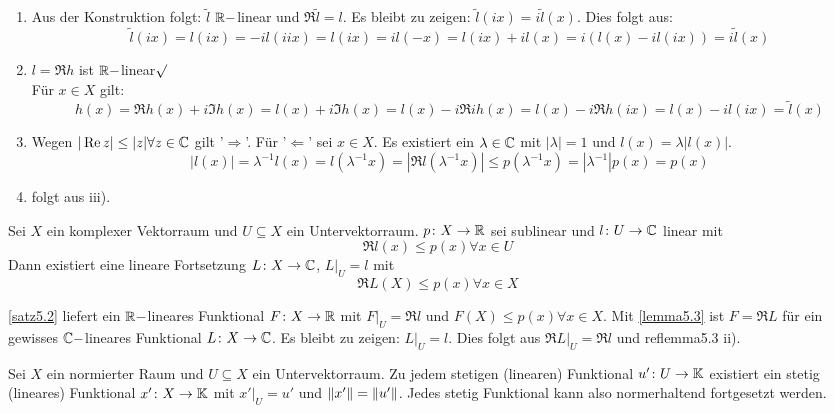 \begin{beweis}
	\begin{enumerate}
		\item Aus der Konstruktion folgt: $ \tilde l $ $ \mathbb{R}- $linear und $ \Re\tilde l=l $. Es bleibt zu zeigen: $ \tilde l(ix)=i\tilde l(x) $. Dies folgt aus:
		\[ \tilde l(ix)=l(ix)=-il(iix)=l(ix)=il(-x)=l(ix)+il(x)=i(l(x)-il(ix))=i\tilde l(x) \]
		\item $ l=\Re h $ ist $ \mathbb{R}- $linear$ \surd $\\
		F\"ur $ x\in X $ gilt:
		\[ h(x)=\Re h(x)+i\Im h(x)=l(x)+i\Im h(x)=l(x)-i\Re ih(x)=l(x)-i\Re h(ix)=l(x)-il(ix)=\tilde l(x) \] 
		\item Wegen $ |\operatorname{Re} z|\leq |z|\forall z\in\mathbb{C} $ gilt '$ \Rightarrow $'. F\"ur '$ \Leftarrow $' sei $ x\in X $. Es existiert ein $ \lambda\in\mathbb{C} $ mit $ |\lambda|=1 $ und $ l(x)=\lambda|l(x)| $.
		\[ |l(x)|=\lambda^{-1}l(x)=l(\lambda^{-1}x)=|\Re l(\lambda^{-1}x)|\leq p(\lambda^{-1}x)=|\lambda^{-1}|p(x)=p(x) \]
		\item folgt aus iii).
	\end{enumerate}
\end{beweis}
\begin{satz}
	Sei $ X $ ein komplexer Vektorraum und $ U\subseteq X $ ein Untervektorraum. $ p\colon X\rightarrow\mathbb{R} $ sei sublinear und $ l\colon U\rightarrow\mathbb{C} $ linear mit \[ \Re l(x)\leq  p(x)\forall x\in U \]
	Dann existiert eine lineare Fortsetzung $ L\colon X\rightarrow\mathbb{C} $, $ L|_U=l $ mit
	\[ \Re L(X)\leq p(x)\forall x\in X \] 
\end{satz}
\begin{beweis}
	\ref{satz5.2} liefert ein $ \mathbb{R}- $lineares Funktional $ F\colon X\rightarrow\mathbb{R} $ mit $ F|_U=\Re l $ und $ F(X)\leq p(x)\forall x\in X $. Mit \ref{lemma5.3} ist $ F=\Re L $ f\"ur ein gewisses $ \mathbb{C}- $lineares Funktional $ L\colon X\rightarrow\mathbb{C} $. Es bleibt zu zeigen: $ L|_U=l $. Dies folgt aus $ \Re L|_U=\Re l $ und  ref{lemma5.3} ii). 
\end{beweis}
\begin{satz}
	Sei $ X $ ein normierter Raum und $ U\subseteq X $ ein Untervektorraum. Zu jedem stetigen (linearen) Funktional $ u'\colon U\rightarrow\mathbb{K} $ existiert ein stetig (lineares) Funktional $ x'\colon X\rightarrow\mathbb{K} $ mit $ x'|_U=u' $ und $ \left\|x'\right\|=\left\|u'\right\| $. Jedes stetig Funktional kann also normerhaltend fortgesetzt werden.
\end{satz}
